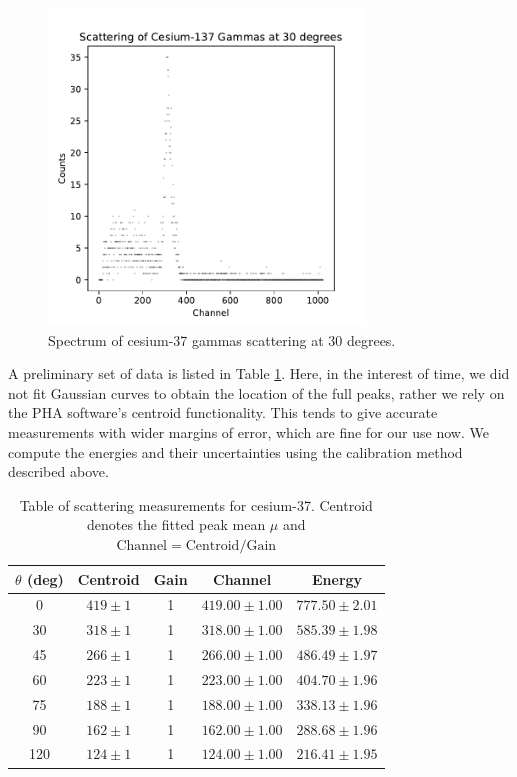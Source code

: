 \documentclass[12pt, letterpaper]{article}
\begin{document}
\begin{figure}[!h]
    \centering
    \includegraphics[width=0.75\textwidth]{experiment2/figures/scattering1-30.pdf}
    \caption{Spectrum of cesium-37 gammas scattering at 30 degrees. }
    \label{fig:scattering1-30}
\end{figure}

A preliminary set of data is listed in Table \ref{table:scattering1}. Here, in the interest of time, we did not fit Gaussian curves to obtain the location of the full peaks, rather we rely on the PHA software's centroid functionality. This tends to give accurate measurements with wider margins of error, which are fine for our use now. We compute the energies and their uncertainties using the calibration method described above. 

\begin{table}[!h]
\footnotesize
\centering
\begin{tabular}{| c | c c | c c |}
    \hline
    $\theta$ (deg) & Centroid & Gain & Channel & Energy \\
    \hline
    0 & $419 \pm 1$ & 1 & $419.00 \pm 1.00$ & $777.50 \pm 2.01$ \\
    30 & $318 \pm 1$ & 1 & $318.00 \pm 1.00$ & $585.39 \pm 1.98$ \\
    45 & $266 \pm 1$ & 1 & $266.00 \pm 1.00$ & $486.49 \pm 1.97$ \\
    60 & $223 \pm 1$ & 1 & $223.00 \pm 1.00$ & $404.70 \pm 1.96$ \\
    75 & $188 \pm 1$ & 1 & $188.00 \pm 1.00$ & $338.13 \pm 1.96$ \\
    90 & $162 \pm 1$ & 1 & $162.00 \pm 1.00$ & $288.68 \pm 1.96$ \\
    120 & $124 \pm 1$ & 1 & $124.00 \pm 1.00$ & $216.41 \pm 1.95$ \\
    \hline
\end{tabular}
\caption{Table of scattering measurements for cesium-37. Centroid denotes the fitted peak mean $\mu$ and $\text{Channel}=\text{Centroid}/\text{Gain}$}
\label{table:scattering1}
\end{table}
\end{document}
